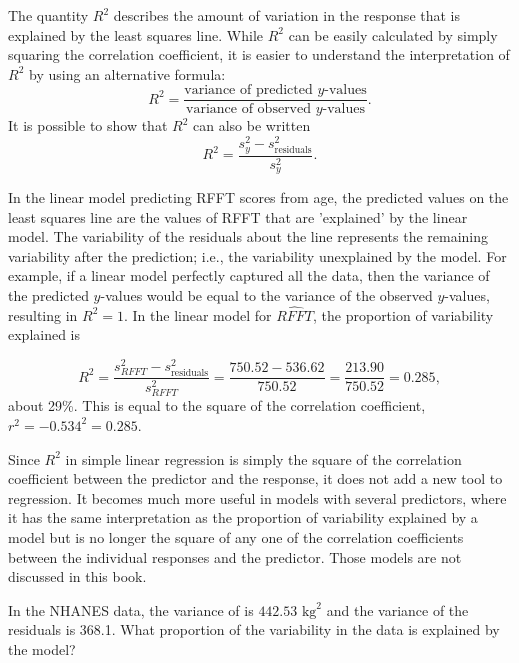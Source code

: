The quantity $R^2$ describes the amount of variation in the response that is explained by the least squares line. While $R^2$ can be easily calculated by simply squaring the correlation coefficient, it is easier to understand the interpretation of $R^2$ by using an alternative formula:
\[R^{2} = \dfrac{\text{variance of predicted $y$-values}}{\text{variance of observed $y$-values}}.\]
It is possible to show that $R^2$ can also be written
\[R^{2} = \dfrac{s^{2}_{y} - s_{\text{residuals}}^2}{s^{2}_{y}}.\]

In the linear model predicting RFFT scores from age, the predicted values on the least squares line are the values of RFFT that are 'explained' by the linear model. The variability of the residuals about the line represents the remaining variability after the prediction; i.e., the variability unexplained by the model. For example, if a linear model perfectly captured all the data, then the variance of the predicted $y$-values would be equal to the variance of the observed $y$-values, resulting in $R^2 = 1$. In the linear model for $\widehat{RFFT}$, the proportion of variability explained is

\[R^{2} = \dfrac{s^{2}_{RFFT} - s_{\text{residuals}}^2}{s^{2}_{RFFT}} = \dfrac{750.52 - 536.62}{750.52} = \dfrac{213.90}{750.52} = 0.285, \]
about 29\%. This is equal to the square of the correlation coefficient, $r^2 = -0.534^{2} = 0.285$. 

Since $R^2$ in simple linear regression is simply the square of the correlation coefficient between the predictor and the response, it does not add a new tool to regression.  It becomes much more useful in models with several predictors, where it has the same interpretation as the proportion of variability explained by a model but is no longer the square of any one of the correlation coefficients between the individual responses and the predictor.  Those models are not discussed in this book.

\begin{exercisewrap}
\begin{nexercise}
In the NHANES data, the variance of  is $442.53$ $\text{kg}^2$ and the variance of the residuals is 368.1. What proportion of the variability in the data is explained by the model?\footnotemark{}
\end{nexercise}
\end{exercisewrap}

